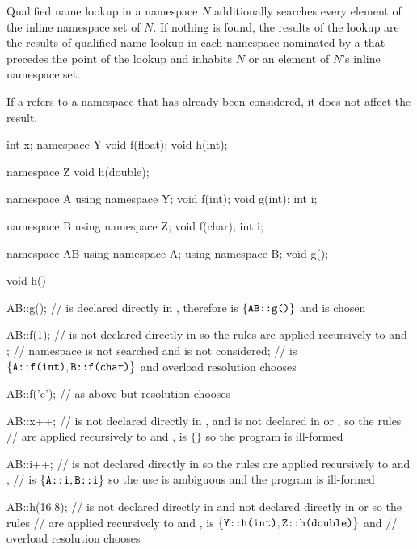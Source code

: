 \pnum
Qualified name lookup in a namespace $N$ additionally searches
every element of the inline namespace set of $N$.
If nothing is found,
the results of the lookup are the results of qualified name lookup
in each namespace nominated by a 
that precedes the point of the lookup and
inhabits $N$ or an element of $N$'s inline namespace set.
\begin{note}
If a  refers to a namespace
that has already been considered, it does not affect the result.
\end{note}
\begin{example}
\begin{codeblock}
int x;
namespace Y {
  void f(float);
  void h(int);
}

namespace Z {
  void h(double);
}

namespace A {
  using namespace Y;
  void f(int);
  void g(int);
  int i;
}

namespace B {
  using namespace Z;
  void f(char);
  int i;
}

namespace AB {
  using namespace A;
  using namespace B;
  void g();
}

void h()
{
  AB::g();          //  is declared directly in , therefore  is $\{ \texttt{AB::g()} \}$ and  is chosen

  AB::f(1);         //  is not declared directly in  so the rules are applied recursively to  and ;
                    // namespace  is not searched and  is not considered;
                    //  is $\{ \texttt{A::f(int)}, \texttt{B::f(char)} \}$ and overload resolution chooses 

  AB::f('c');       // as above but resolution chooses 

  AB::x++;          //  is not declared directly in , and is not declared in  or , so the rules
                    // are applied recursively to  and ,  is $\{ \}$ so the program is ill-formed

  AB::i++;          //  is not declared directly in  so the rules are applied recursively to  and ,
                    //  is $\{ \texttt{A::i}, \texttt{B::i} \}$ so the use is ambiguous and the program is ill-formed

  AB::h(16.8);      //  is not declared directly in  and not declared directly in  or  so the rules
                    // are applied recursively to  and ,  is $\{ \texttt{Y::h(int)}, \texttt{Z::h(double)} \}$ and
                    // overload resolution chooses 
}
\end{codeblock}
\end{example}

